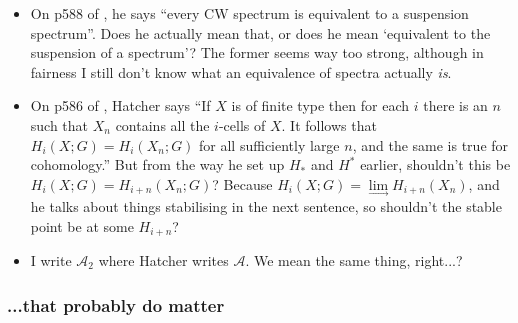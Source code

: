 \documentclass{MetricNotes2023}
\def\A{\ensuremath{\mathscr{A}_2}}
\begin{document}
\begin{itemize}


\item On p588 of \autocite{hatcher5}, he says ``every CW spectrum is equivalent to a suspension spectrum''. Does he actually mean that, or does he mean `equivalent to the suspension of a spectrum'? The former seems way too strong, although in fairness I still don't know what an equivalence of spectra actually \textit{is}. 

\item On p586 of \autocite{hatcher5}, Hatcher says ``If \(X\) is of finite type then for each \(i\) there is an \(n\) such that \(X_n\) contains all the \(i\)-cells of \(X\). It follows that \(H_i(X;G)=H_i(X_n;G)\) for all sufficiently large \(n\), and the same is true for cohomology.'' But from the way he set up \(H_*\) and \(H^*\) earlier, shouldn't this be \(H_i(X;G)=H_{i+n}(X_n; G)\)? Because \(H_i(X;G)=\lim\limits_{\rightarrow}H_{i+n}(X_n)\), and he talks about things stabilising in the next sentence, so shouldn't the stable point be at some \(H_{i+n}\)?

\item I write \(\A\) where Hatcher writes \(\mathscr{A}\). We mean the same thing, right...?

\end{itemize}

\subsubsection{...that probably do matter}\label{2504011259timeforlunchithink}
\end{document}
